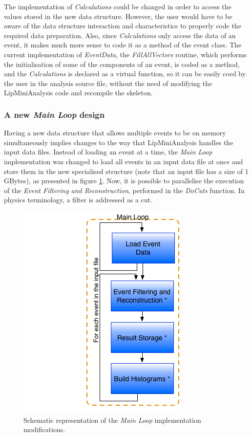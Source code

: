 The implementation of \textit{Calculations} could be changed in order to access the values stored in the new data structure. However, the user would have to be aware of the data structure interaction and characteristics to properly code the required data preparation. Also, since \textit{Calculations} only access the data of an event, it makes much more sense to code it as a method of the event class. The current implementation of \textit{EventData}, the \textit{FillAllVectors} routine, which performs the initialisation of some of the components of an event, is coded as a method, and the \textit{Calculations} is declared as a virtual function, so it can be easily coed by the user in the analysis source file, without the need of modifying the LipMiniAnalysis code and recompile the skeleton.

\subsubsection*{A new \textit{Main Loop} design}

Having a new data structure that allows multiple events to be on memory simultaneously implies changes to the way that LipMiniAnalysis handles the input data files. Instead of loading an event at a time, the \textit{Main Loop} implementation was changed to load all events in an input data file at once and store them in the new specialised structure (note that an input file has a size of 1 GBytes), as presented in figure \ref{fig:new_loop}. Now, it is possible to parallelise the execution of the \textit{Event Filtering and Reconstruction}, performed in the \textit{DoCuts} function. In physics terminology, a filter is addressed as a cut.

\begin{figure}[!htp]
	\begin{center}
		\includegraphics[scale=0.5]{imgs/new_loop.png}
		\caption{Schematic representation of the \textit{Main Loop} implementation modifications.}
		\label{fig:new_loop}
	\end{center}
\end{figure}

